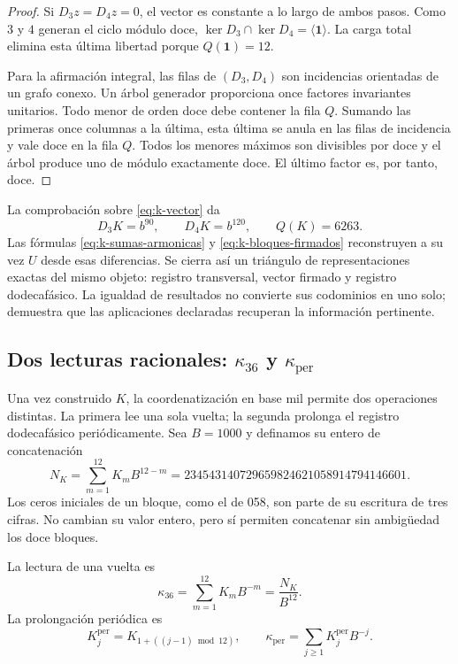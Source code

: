 \begin{proof}
Si \(D_3z=D_4z=0\), el vector es constante a lo largo de ambos pasos.
Como \(3\) y \(4\) generan el ciclo módulo doce,
\(\ker D_3\cap\ker D_4=\langle\mathbf1\rangle\). La carga total
elimina esta última libertad porque \(Q(\mathbf1)=12\).

Para la afirmación integral, las filas de \((D_3,D_4)\) son incidencias
orientadas de un grafo conexo. Un árbol generador proporciona once
factores invariantes unitarios. Todo menor de orden doce debe contener la
fila \(Q\). Sumando las primeras once columnas a la última, esta última
se anula en las filas de incidencia y vale doce en la fila \(Q\). Todos
los menores máximos son divisibles por doce y el árbol produce uno de
módulo exactamente doce. El último factor es, por tanto, doce.
\end{proof}

La comprobación sobre \eqref{eq:k-vector} da
\[
 D_3K=b^{90},\qquad D_4K=b^{120},\qquad Q(K)=6263.
\]
Las fórmulas \eqref{eq:k-sumas-armonicas} y
\eqref{eq:k-bloques-firmados} reconstruyen a su vez \(U\) desde esas
diferencias. Se cierra así un triángulo de representaciones exactas del
mismo objeto: registro transversal, vector firmado y registro dodecafásico. La igualdad
de resultados no convierte sus codominios en uno solo; demuestra que
las aplicaciones declaradas recuperan la información pertinente.

\subsection{Dos lecturas racionales: \texorpdfstring{\(\kappa_{36}\)}{kappa36} y \texorpdfstring{\(\kappa_{\mathrm{per}}\)}{kappa periódica}}
\label{subsec:k-kappas}

Una vez construido \(K\), la coordenatización en base mil permite dos operaciones
distintas. La primera lee una sola vuelta; la segunda prolonga el registro dodecafásico
periódicamente. Sea \(B=1000\) y definamos su entero de concatenación
\begin{equation}
 N_K=\sum_{m=1}^{12}K_mB^{12-m}
 =234543140729659824621058914794146601.
 \label{eq:k-numerador}
\end{equation}
Los ceros iniciales de un bloque, como el de 058, son parte de su escritura
de tres cifras. No cambian su valor entero, pero sí permiten concatenar
sin ambigüedad los doce bloques.

\begin{definition}
\label{def:k-kappas}
La lectura de una vuelta es
\[
 \kappa_{36}=\sum_{m=1}^{12}K_mB^{-m}=\frac{N_K}{B^{12}}.
\]
La prolongación periódica es
\[
 K_j^{\mathrm{per}}=K_{1+((j-1)\bmod12)},\qquad
 \kappa_{\mathrm{per}}=\sum_{j\geq1}K_j^{\mathrm{per}}B^{-j}.
\]
\end{definition}

